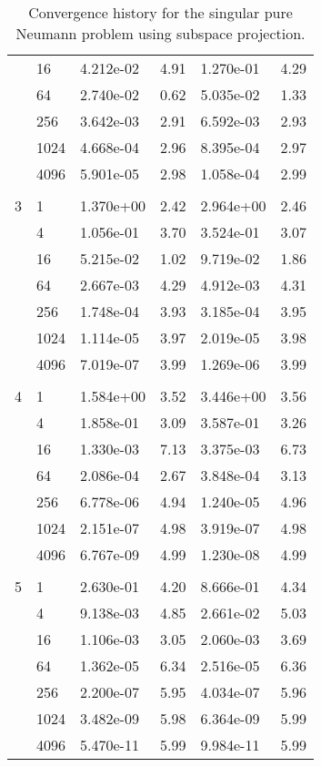\begin{table}[H]
\begin{center}
{\begin{tabular}{llllll}
  & 16 & 4.212e-02 & 4.91 & 1.270e-01 & 4.29\\
  & 64 & 2.740e-02 & 0.62 & 5.035e-02 & 1.33\\
  & 256 & 3.642e-03 & 2.91 & 6.592e-03 & 2.93\\
  & 1024 & 4.668e-04 & 2.96 & 8.395e-04 & 2.97\\
  & 4096 & 5.901e-05 & 2.98 & 1.058e-04 & 2.99\\
&&&&& \\
3 & 1 & 1.370e+00 & 2.42 & 2.964e+00 & 2.46\\
  & 4 & 1.056e-01 & 3.70 & 3.524e-01 & 3.07\\
  & 16 & 5.215e-02 & 1.02 & 9.719e-02 & 1.86\\
  & 64 & 2.667e-03 & 4.29 & 4.912e-03 & 4.31\\
  & 256 & 1.748e-04 & 3.93 & 3.185e-04 & 3.95\\
  & 1024 & 1.114e-05 & 3.97 & 2.019e-05 & 3.98\\
  & 4096 & 7.019e-07 & 3.99 & 1.269e-06 & 3.99\\
&&&&& \\
4 & 1 & 1.584e+00 & 3.52 & 3.446e+00 & 3.56\\
  & 4 & 1.858e-01 & 3.09 & 3.587e-01 & 3.26\\
  & 16 & 1.330e-03 & 7.13 & 3.375e-03 & 6.73\\
  & 64 & 2.086e-04 & 2.67 & 3.848e-04 & 3.13\\
  & 256 & 6.778e-06 & 4.94 & 1.240e-05 & 4.96\\
  & 1024 & 2.151e-07 & 4.98 & 3.919e-07 & 4.98\\
  & 4096 & 6.767e-09 & 4.99 & 1.230e-08 & 4.99\\
&&&&& \\
5 & 1 & 2.630e-01 & 4.20 & 8.666e-01 & 4.34\\
  & 4 & 9.138e-03 & 4.85 & 2.661e-02 & 5.03\\
  & 16 & 1.106e-03 & 3.05 & 2.060e-03 & 3.69\\
  & 64 & 1.362e-05 & 6.34 & 2.516e-05 & 6.36\\
  & 256 & 2.200e-07 & 5.95 & 4.034e-07 & 5.96\\
  & 1024 & 3.482e-09 & 5.98 & 6.364e-09 & 5.99\\
  & 4096 & 5.470e-11 & 5.99 & 9.984e-11 & 5.99\\
  \bottomrule
\end{tabular}
}\endgroup %
\end{center}
\caption{Convergence history for the singular pure Neumann problem using subspace projection.}
\label{tab:pure_neumann_convergence}
\end{table}
